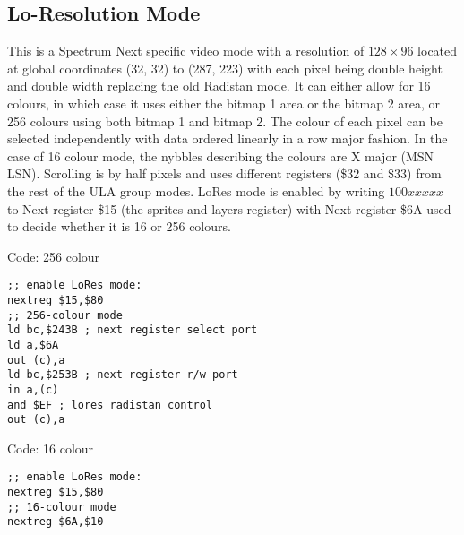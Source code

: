 \subsection{Lo-Resolution Mode}
This is a Spectrum Next specific video mode with a resolution of
$128\times96$ located at global coordinates (32, 32) to (287, 223)
with each pixel being double height and double width replacing the old
Radistan mode.  It can either allow for 16 colours, in which case it
uses either the bitmap 1 area or the bitmap 2 area, or 256 colours
using both bitmap 1 and bitmap 2. The colour of each pixel can be
selected independently with data ordered linearly in a row major
fashion. In the case of 16 colour mode, the nybbles describing the
colours are X major (MSN LSN). Scrolling is by half pixels and uses
different registers (\$32 and \$33) from the rest of the ULA group
modes. LoRes mode is enabled by writing $100xxxxx$ to Next register
\$15 (the sprites and layers register) with Next register \$6A used to
decide whether it is 16 or 256 colours.






\sinset
Code: 256 colour
\begin{verbatim}
;; enable LoRes mode:
nextreg $15,$80
;; 256-colour mode
ld bc,$243B ; next register select port
ld a,$6A
out (c),a
ld bc,$253B ; next register r/w port
in a,(c)
and $EF ; lores radistan control
out (c),a
\end{verbatim}

Code: 16 colour
\begin{verbatim}
;; enable LoRes mode:
nextreg $15,$80
;; 16-colour mode
nextreg $6A,$10
\end{verbatim}
\einset

